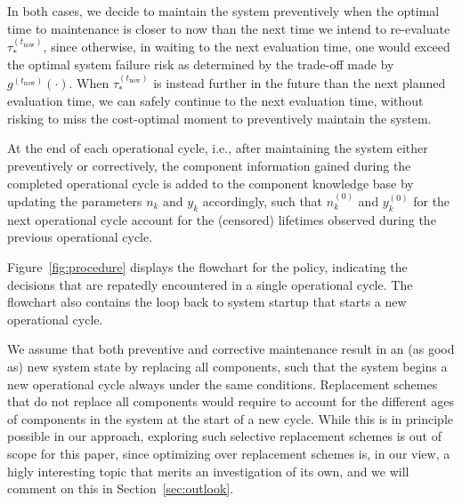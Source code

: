 \documentclass[authoryear]{elsarticle}
\newcommand{\uz}{^{(0)}} %
\def\ykz{y\uz_k}
\def\nkz{n\uz_k}
\newcommand{\nk}{n_k}
\newcommand{\yk}{y_k}
\def\tnow{t_\text{now}}
\newcommand{\gnow}{g^{(\tnow)}}
\newcommand{\tausnow}{\tau_*^{(\tnow)}}
\begin{document}
In both cases, we decide to maintain the system preventively
when the optimal time to maintenance is closer to now than the next time we intend to re-evaluate $\tausnow$,
since otherwise, in waiting to the next evaluation time,
one would exceed the optimal system failure risk 
as determined by the trade-off made by $\gnow(\cdot)$.
When $\tausnow$ is instead further in the future than the next planned evaluation time,
we can safely continue to the next evaluation time,
without risking to miss the cost-optimal moment to preventively maintain the system.

At the end of each operational cycle, i.e.,
after maintaining the system either preventively or correctively,
the component information gained during the completed operational cycle is added to the component knowledge base
by updating the parameters $\nk$ and $\yk$ accordingly,
such that $\nkz$ and $\ykz$ for the next operational cycle
account for the (censored) lifetimes observed during the previous operational cycle.

Figure~\ref{fig:procedure} displays the flowchart for the policy,
indicating the decisions that are repatedly encountered in a single operational cycle.
The flowchart also contains the loop back to system startup that starts a new operational cycle.

We assume that both preventive and corrective maintenance result in an (as good as) new system state by replacing all components,
such that the system begins a new operational cycle always under the same conditions.
Replacement schemes that do not replace all components would require to account for the different ages of components in the system
at the start of a new cycle.
While this is in principle possible in our approach,
exploring such selective replacement schemes is out of scope for this paper,
since optimizing over replacement schemes is, in our view, a higly interesting topic
that merits an investigation of its own,
and we will comment on this in Section~\ref{sec:outlook}.
%
\end{document}

